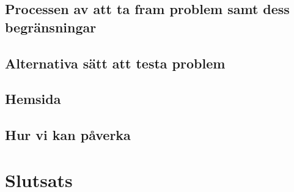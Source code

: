 \documentclass[11pt,a4paper]{article}
\begin{document}
    
    \subsection{Processen av att ta fram problem samt dess begränsningar}
        
        
    \subsection{Alternativa sätt att testa problem}
        
        
    \subsection{Hemsida}
        
        
    \subsection{Hur vi kan påverka}
        

\section{Slutsats}

\newpage
\begin{thebibliography}{3}
    
\end{thebibliography}
\end{document}
